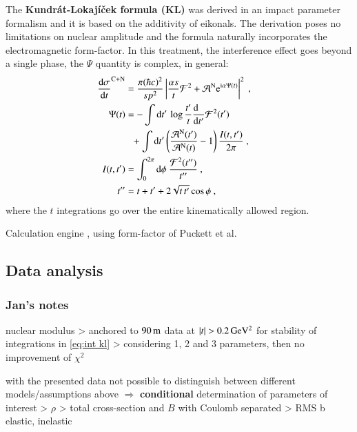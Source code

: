 The {\bf Kundr\' at-Lokaj\' i\v cek formula (KL)} \cite{kl94} was derived in an impact parameter formalism and it is based on the additivity of eikonals. The derivation poses no limitations on nuclear amplitude and the formula naturally incorporates the electromagnetic form-factor. In this treatment, the interference effect goes beyond a single phase, the $\Psi$ quantity is complex, in general:
\begin{equation}
\label{eq:int kl}
	\begin{aligned}
		{\d\sigma\over \d t}^{\rm C+N} &= {\pi (\hbar c)^2 \over s p^2} \left | {\alpha s\over t} {\cal F}^2 + {\cal A}^{\rm N} \e^{\I\alpha \Psi(t)} \right |^2\ ,\cr
		\Psi(t) &= 
			- \int \d t'\, \log {t'\over t} {\d\phantom{t'}\over \d t'} {\cal F}^2(t') \cr
		&\phantom{=} + \int \d t' \left( {{\cal A}^{\rm N}(t') \over {\cal A}^{\rm N}(t)} - 1 \right) { I(t, t')\over 2\pi }
			\ ,\cr
		I(t, t') &= \int_0^{2\pi} \d\phi\ {{\cal F}^2(t'')\over t''}\ , \cr
		t'' &= t + t' + 2\sqrt{t\, t'} \cos\phi\ ,\cr
	\end{aligned}
\end{equation}
where the $t$ integrations go over the entire kinematically allowed region.

Calculation engine \cite{elegent}, using form-factor of Puckett et al.~\cite{puckett10}

\subsection{Data analysis}
\label{sec:cni_anal}

\subsubsection{Jan's notes}

\> nuclear modulus
\>> anchored to $90\,{\rm m}$ data at $|t| > 0.2\,{\rm GeV^2}$ for stability of integrations in \ref{eq:int kl}
\>> considering 1, 2 and 3 parameters, then no improvement of $\chi^2$

\> with the presented data not possible to distinguish between different models/assumptions above $\Rightarrow$ {\bf conditional} determination of parameters of interest
\>> $\rho$
\>> total cross-section and $B$ with Coulomb separated
\>> RMS b elastic, inelastic


